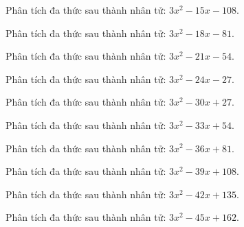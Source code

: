 \begin{bt}
	Phân tích đa thức sau thành nhân tử: $3 x^2 - 15 x - 108$.
\end{bt}
\begin{bt}
	Phân tích đa thức sau thành nhân tử: $3 x^2 - 18 x - 81$.
\end{bt}
\begin{bt}
	Phân tích đa thức sau thành nhân tử: $3 x^2 - 21 x - 54$.
\end{bt}
\begin{bt}
	Phân tích đa thức sau thành nhân tử: $3 x^2 - 24 x - 27$.
\end{bt}
\begin{bt}
	Phân tích đa thức sau thành nhân tử: $3 x^2 - 30 x + 27$.
\end{bt}
\begin{bt}
	Phân tích đa thức sau thành nhân tử: $3 x^2 - 33 x + 54$.
\end{bt}
\begin{bt}
	Phân tích đa thức sau thành nhân tử: $3 x^2 - 36 x + 81$.
\end{bt}
\begin{bt}
	Phân tích đa thức sau thành nhân tử: $3 x^2 - 39 x + 108$.
\end{bt}
\begin{bt}
	Phân tích đa thức sau thành nhân tử: $3 x^2 - 42 x + 135$.
\end{bt}
\begin{bt}
	Phân tích đa thức sau thành nhân tử: $3 x^2 - 45 x + 162$.
\end{bt}

